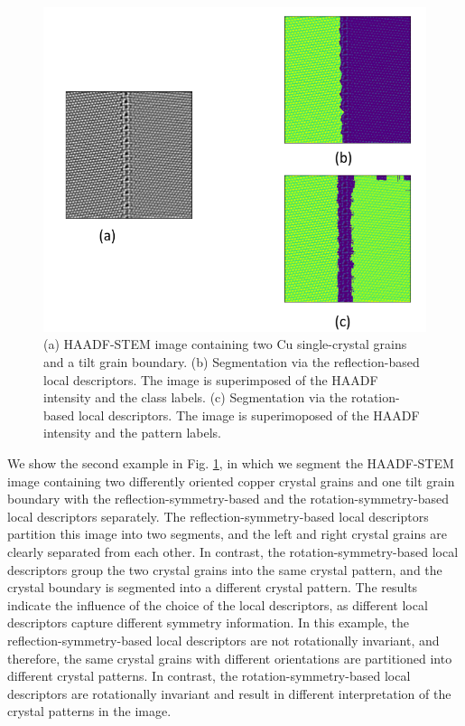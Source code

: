 \documentclass[twocolumn,amsmath, floatfix]{revtex4}
\begin{document}
\begin{figure}
    \centering
    \includegraphics[width=0.8\columnwidth]{Cu_grain_boundary.png}
    \caption{ (a) HAADF-STEM image containing two Cu single-crystal grains and a tilt grain boundary. (b) Segmentation via the reflection-based local descriptors. The image is superimposed of the HAADF intensity and the class labels. (c) Segmentation via the rotation-based local descriptors. The image is superimoposed of the HAADF intensity and the pattern labels.   }
    \label{fig:Cu_grain_boundary}
\end{figure}

We show the second example in Fig. \ref{fig:Cu_grain_boundary}, in which we segment the HAADF-STEM image containing two differently oriented copper crystal grains and one tilt grain boundary with the reflection-symmetry-based and the rotation-symmetry-based local descriptors separately. The reflection-symmetry-based local descriptors partition this image into two segments, and the left and right crystal grains are clearly separated from each other. In contrast,  the rotation-symmetry-based local descriptors group the two crystal grains into the same crystal pattern, and the crystal boundary is segmented into a different crystal pattern. 
The results indicate the influence of the choice of the local descriptors, as different local descriptors capture different symmetry information. In this example, the reflection-symmetry-based local descriptors are not rotationally invariant, and therefore, the same crystal grains with different orientations are partitioned into different crystal patterns. In contrast, the rotation-symmetry-based local descriptors are rotationally invariant and result in different interpretation of the crystal patterns in the image.
\end{document}
